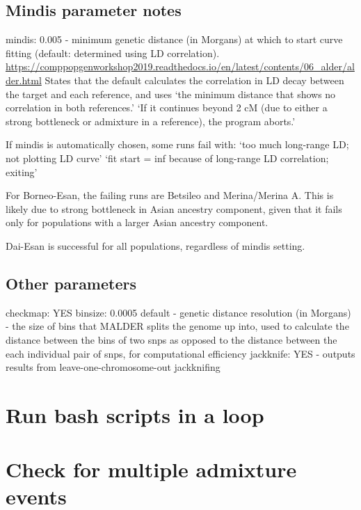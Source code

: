 \documentclass[
]{article}
\begin{document}
\subsection{Mindis parameter notes}\label{mindis-parameter-notes}

mindis: 0.005 - minimum genetic distance (in Morgans) at which to start
curve fitting (default: determined using LD correlation).
\url{https://comppopgenworkshop2019.readthedocs.io/en/latest/contents/06_alder/alder.html}
States that the default calculates the correlation in LD decay between
the target and each reference, and uses `the minimum distance that shows
no correlation in both references.' `If it continues beyond 2 cM (due to
either a strong bottleneck or admixture in a reference), the program
aborts.'

If mindis is automatically chosen, some runs fail with: `too much
long-range LD; not plotting LD curve' `fit start = inf because of
long-range LD correlation; exiting'

For Borneo-Esan, the failing runs are Betsileo and Merina/Merina A. This
is likely due to strong bottleneck in Asian ancestry component, given
that it fails only for populations with a larger Asian ancestry
component.

Dai-Esan is successful for all populations, regardless of mindis
setting.

\subsection{Other parameters}\label{other-parameters}

checkmap: YES binsize: 0.0005 default - genetic distance resolution (in
Morgans) - the size of bins that MALDER splits the genome up into, used
to calculate the distance between the bins of two snps as opposed to the
distance between the each individual pair of snps, for computational
efficiency jackknife: YES - outputs results from
leave-one-chromosome-out jackknifing

\section{Run bash scripts in a loop}\label{run-bash-scripts-in-a-loop}

\section{Check for multiple admixture
events}\label{check-for-multiple-admixture-events}
\end{document}
